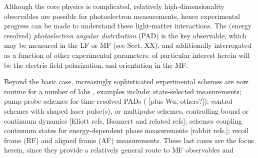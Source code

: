 Although the core physics is complicated, relatively high-dimensionality observables are possible for photoelectron measurements, hence experimental progress can be made to understand these light-matter interactions. The (energy resolved) \textit{photoelectron angular distribution} (PAD) is the key observable, which may be measured in the LF or MF (see Sect. XX), and additionally interrogated as a function of other experimental parameters: of particular interest herein will be the electric field polarization, and orientation in the MF. 

Beyond the basic case, increasingly sophisticated experimental schemes are now routine for a number of labs \cite{Reid2012}, examples include: state-selected measurements; pump-probe schemes for time-resolved PADs (\cite{Seideman2002} [plus Wu, others?]); control schemes with shaped laser pulse(s), or multipulse schemes, controlling bound or continuum dynamics [Eliott refs, Baumert and related refs]; schemes coupling continuum states for energy-dependent phase measurements [rabbit refs.]; recoil frame (RF) and aligned frame (AF) measurements. These last cases are the focus herein, since they provide a relatively general route to MF observables and 


